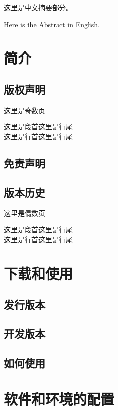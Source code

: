 \documentclass[doctor,openright]{buaathesis}
\begin{document}
\maketitle

\frontmatter
\tableofcontents
\begin{cabstract}
这里是中文摘要部分。
\end{cabstract}
\begin{eabstract}
Here is the Abstract in English.
\end{eabstract}
\mainmatter
\chapter{简介}
	\section{版权声明}
	这里是奇数页\par
	这里是段首\hfill 这里是行尾\\
	这里是行首\hfill 这里是行尾\\
	\section{免责声明}
	\newpage
	\section{版本历史}
	这里是偶数页\par
	这里是段首\hfill 这里是行尾\\
	这里是行首\hfill 这里是行尾\\
	
\chapter{下载和使用}
	\section{发行版本}
	\section{开发版本}
	\section{如何使用}
	
\chapter{软件和环境的配置}
\end{document}
